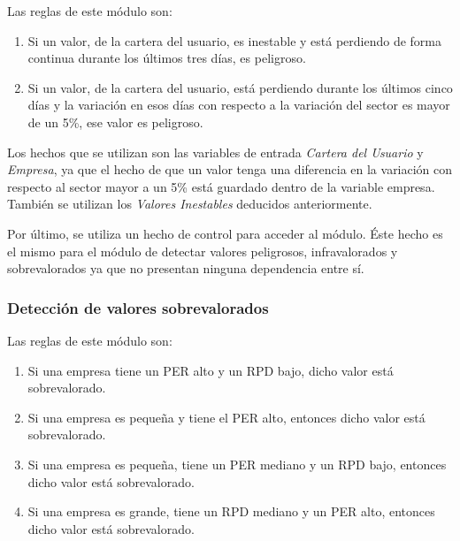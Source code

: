 \documentclass[11pt,openany]{book} %
\begin{document}
Las reglas de este módulo son:

\begin{enumerate}[\qquad\color{ocre}{$\bullet$}]
    \item Si un valor, de la cartera del usuario, es inestable y está perdiendo de forma continua durante los últimos tres días, es peligroso.

    \item Si un valor, de la cartera del usuario, está perdiendo durante los últimos cinco días y la variación en esos días con respecto a la variación del sector es mayor de un 5\%, ese valor es peligroso.
\end{enumerate}

Los hechos que se utilizan son las variables de entrada \textit{\textcolor{ocre}{Cartera del Usuario}} y \textit{\textcolor{ocre}{Empresa}}, ya que el hecho de que un valor tenga una diferencia en la variación con respecto al sector mayor a un 5\% está guardado dentro de la variable empresa. También se utilizan los \textit{\textcolor{ocre}{Valores Inestables}} deducidos anteriormente. 

Por último, se utiliza un hecho de control para acceder al módulo. Éste hecho es el mismo para el módulo de detectar valores peligrosos, infravalorados y sobrevalorados ya que no presentan ninguna dependencia entre sí.

\subsubsection{Detección de valores sobrevalorados}

Las reglas de este módulo son:

\begin{enumerate}[\qquad\color{ocre}{$\bullet$}]
    \item Si una empresa tiene un PER alto y un RPD bajo, dicho valor está sobrevalorado.

    \item Si una empresa es pequeña y tiene el PER alto, entonces dicho valor está sobrevalorado.

    \item Si una empresa es pequeña, tiene un PER mediano y un RPD bajo, entonces dicho valor está sobrevalorado.

    \item Si una empresa es grande, tiene un RPD mediano y un PER alto, entonces dicho valor está sobrevalorado.
\end{enumerate}
\end{document}
